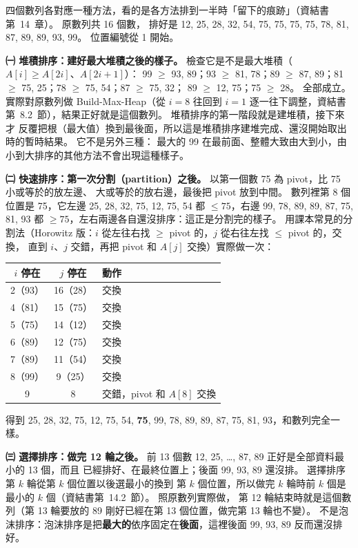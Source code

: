 \begin{pastsoln}
四個數列各對應一種方法，看的是各方法排到一半時「留下的痕跡」（資結書第~14~章）。 原數列共 16 個數，
排好是 12, 25, 28, 32, 54, 75, 75, 75, 75, 78, 81, 87, 89, 89, 93, 99。 位置編號從 1 開始。

\textbf{㈠ 堆積排序：建好最大堆積之後的樣子。} 檢查它是不是最大堆積（$A[i] \ge A[2i]$、$A[2i+1]$）：
99 $\ge$ 93, 89；93 $\ge$ 81, 78；89 $\ge$ 87, 89；81 $\ge$ 75, 25；78 $\ge$ 75, 54；87 $\ge$ 75, 32；
89 $\ge$ 12, 75；75 $\ge$ 28。 全部成立。 實際對原數列做 Build-Max-Heap（從 $i = 8$ 往回到 $i = 1$
逐一往下調整，資結書第~8.2~節），結果正好就是這個數列。 堆積排序的第一階段就是建堆積，接下來才
反覆把根（最大值）換到最後面，所以這是堆積排序建堆完成、還沒開始取出時的暫時結果。 它不是另外三種：
最大的 99 在最前面、整體大致由大到小，由小到大排序的其他方法不會出現這種樣子。

\textbf{㈡ 快速排序：第一次分割（partition）之後。} 以第一個數 75 為 pivot，比 75 小或等於的放左邊、
大或等於的放右邊，最後把 pivot 放到中間。 數列裡第 8 個位置是 75，它左邊 25, 28, 32, 75, 12, 75, 54
都 $\le 75$，右邊 99, 78, 89, 89, 87, 75, 81, 93 都 $\ge 75$，左右兩邊各自還沒排序：這正是分割完的樣子。
用課本常見的分割法（Horowitz 版：$i$ 從左往右找 $\ge$ pivot 的，$j$ 從右往左找 $\le$ pivot 的，交換，
直到 $i$、$j$ 交錯，再把 pivot 和 $A[j]$ 交換）實際做一次：
\begin{center}
\begin{tabular}{ccl}
\toprule
$i$ 停在 & $j$ 停在 & 動作 \\
\midrule
2（93） & 16（28） & 交換 \\
4（81） & 15（75） & 交換 \\
5（75） & 14（12） & 交換 \\
6（89） & 12（75） & 交換 \\
7（89） & 11（54） & 交換 \\
8（99） & 9（25） & 交換 \\
9 & 8 & 交錯，pivot 和 $A[8]$ 交換 \\
\bottomrule
\end{tabular}
\end{center}
得到 25, 28, 32, 75, 12, 75, 54, \textbf{75}, 99, 78, 89, 89, 87, 75, 81, 93，和數列完全一樣。

\textbf{㈢ 選擇排序：做完 12 輪之後。} 前 13 個數 12, 25, \dots, 87, 89 正好是全部資料最小的 13 個，而且
已經排好、在最終位置上；後面 99, 93, 89 還沒排。 選擇排序第 $k$ 輪從第 $k$ 個位置以後選最小的換到
第 $k$ 個位置，所以做完 $k$ 輪時前 $k$ 個是最小的 $k$ 個（資結書第~14.2~節）。 照原數列實際做，
第 12 輪結束時就是這個數列（第 13 輪要放的 89 剛好已經在第 13 個位置，做完第 13 輪也不變）。
不是泡沫排序：泡沫排序是把\textbf{最大的}依序固定在\textbf{後面}，這裡後面 99, 93, 89 反而還沒排好。


\end{pastsoln}
